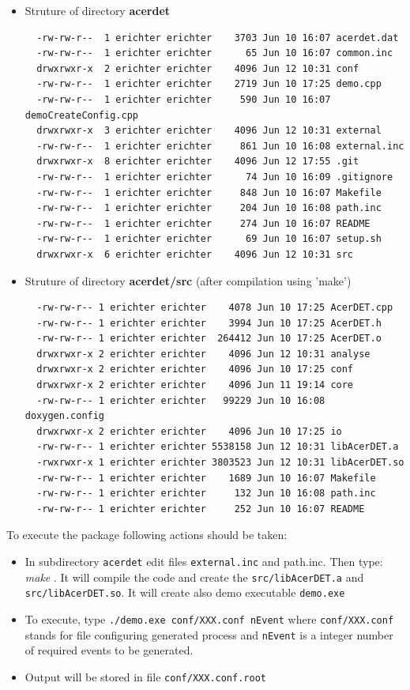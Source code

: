 \begin{itemize}
\item
Struture of directory {\bf acerdet}
{\scriptsize
\begin{verbatim}  
  -rw-rw-r--  1 erichter erichter    3703 Jun 10 16:07 acerdet.dat
  -rw-rw-r--  1 erichter erichter      65 Jun 10 16:07 common.inc
  drwxrwxr-x  2 erichter erichter    4096 Jun 12 10:31 conf
  -rw-rw-r--  1 erichter erichter    2719 Jun 10 17:25 demo.cpp
  -rw-rw-r--  1 erichter erichter     590 Jun 10 16:07 demoCreateConfig.cpp
  drwxrwxr-x  3 erichter erichter    4096 Jun 12 10:31 external
  -rw-rw-r--  1 erichter erichter     861 Jun 10 16:08 external.inc
  drwxrwxr-x  8 erichter erichter    4096 Jun 12 17:55 .git
  -rw-rw-r--  1 erichter erichter      74 Jun 10 16:09 .gitignore
  -rw-rw-r--  1 erichter erichter     848 Jun 10 16:07 Makefile
  -rw-rw-r--  1 erichter erichter     204 Jun 10 16:08 path.inc
  -rw-rw-r--  1 erichter erichter     274 Jun 10 16:07 README
  -rw-rw-r--  1 erichter erichter      69 Jun 10 16:07 setup.sh
  drwxrwxr-x  6 erichter erichter    4096 Jun 12 10:31 src
\end{verbatim} 
}
\item
Struture of directory {\bf acerdet/src} (after compilation using 'make')
{\scriptsize
\begin{verbatim}  
  -rw-rw-r-- 1 erichter erichter    4078 Jun 10 17:25 AcerDET.cpp
  -rw-rw-r-- 1 erichter erichter    3994 Jun 10 17:25 AcerDET.h
  -rw-rw-r-- 1 erichter erichter  264412 Jun 10 17:25 AcerDET.o
  drwxrwxr-x 2 erichter erichter    4096 Jun 12 10:31 analyse
  drwxrwxr-x 2 erichter erichter    4096 Jun 10 17:25 conf
  drwxrwxr-x 2 erichter erichter    4096 Jun 11 19:14 core
  -rw-rw-r-- 1 erichter erichter   99229 Jun 10 16:08 doxygen.config
  drwxrwxr-x 2 erichter erichter    4096 Jun 10 17:25 io
  -rw-rw-r-- 1 erichter erichter 5538158 Jun 12 10:31 libAcerDET.a
  -rwxrwxr-x 1 erichter erichter 3803523 Jun 12 10:31 libAcerDET.so
  -rw-rw-r-- 1 erichter erichter    1689 Jun 10 16:07 Makefile
  -rw-rw-r-- 1 erichter erichter     132 Jun 10 16:08 path.inc
  -rw-rw-r-- 1 erichter erichter     252 Jun 10 16:07 README
\end{verbatim} 
}
\end{itemize}


To execute the package following actions should be taken:
\begin{itemize}
\item
In subdirectory {\tt acerdet} edit files {\tt  external.inc} and {path.inc}.
Then type: {\it make }. It will
compile the code and create the {\tt src/libAcerDET.a} and {\tt src/libAcerDET.so}.
It will create also demo executable {\tt demo.exe}
\item
To execute, type  {\tt ./demo.exe  conf/XXX.conf nEvent}
where  {\tt conf/XXX.conf} stands for file configuring generated process and 
{\tt nEvent} is a integer number of required events to be generated.
\item
Output will be stored in file  {\tt conf/XXX.conf.root}

\end{itemize}


